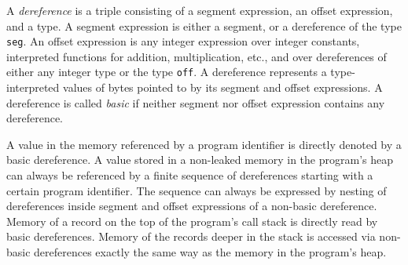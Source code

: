 \documentclass[envcountsame]{llncs}
\begin{document}
A \emph{dereference} is a triple consisting of a segment expression, an offset
expression, and a type. A segment expression is either a segment, or a
dereference of the type \texttt{seg}. An offset expression is any integer
expression over integer constants, interpreted functions for addition,
multiplication, etc., and over dereferences of either any integer type or the
type \texttt{off}. A dereference represents a type-interpreted values of bytes
pointed to by its segment and offset expressions. A dereference is called
\emph{basic} if neither segment nor offset expression contains any dereference.


A value in the memory referenced by a program identifier is directly denoted by
a basic dereference. A value stored in a non-leaked memory in the program's heap
can always be referenced by a finite sequence of dereferences starting with a
certain program identifier. The sequence can always be expressed by nesting of
dereferences inside segment and offset expressions of a non-basic dereference.
Memory of a record on the top of the program's call stack is directly read by
basic dereferences. Memory of the records deeper in the stack is accessed via
non-basic dereferences exactly the same way as the memory in the program's heap.
\end{document}
